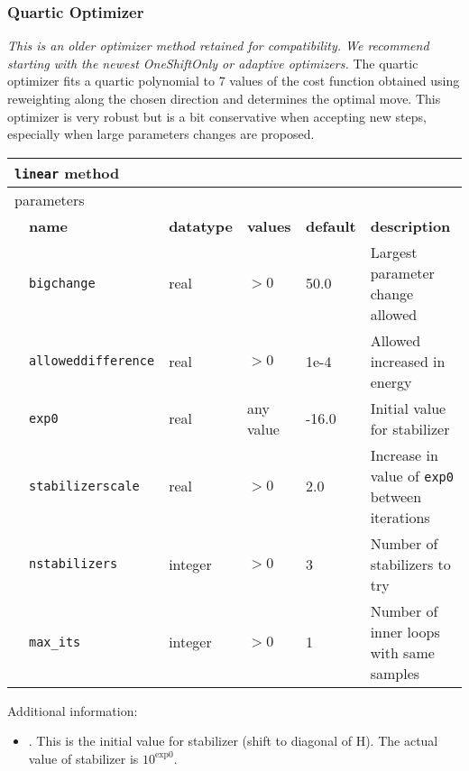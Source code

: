 \subsubsection{Quartic Optimizer}
\textit{This is an older optimizer method retained for compatibility. We recommend starting with the newest OneShiftOnly or adaptive optimizers.}
The quartic optimizer fits a quartic polynomial to 7 values of the cost function obtained using reweighting along the chosen direction and determines the optimal move.
This optimizer is very robust but is a bit conservative when accepting new steps, especially when large parameters changes are proposed.
\begin{table}[h]
\begin{center}
\begin{tabularx}{\textwidth}{l l l l l X }
\hline
\multicolumn{6}{l}{\texttt{linear} method} \\
\hline
\multicolumn{2}{l}{parameters}  & \multicolumn{4}{l}{}\\
   &   \bfseries name     & \bfseries datatype & \bfseries values & \bfseries default   & \bfseries description \\
   &   \texttt{bigchange} &  real     & $>0$ & 50.0  & Largest parameter change allowed\\
   &   \texttt{alloweddifference} &  real     & $>0$ & 1e-4 & Allowed increased in energy\\
   &   \texttt{exp0} &  real     & any value & -16.0 & Initial value for stabilizer\\
   &   \texttt{stabilizerscale} &  real     & $>0$ & 2.0 & Increase in value of \texttt{exp0} between iterations\\
   &   \texttt{nstabilizers} &  integer     & $>0$ & 3 & Number of stabilizers to try\\
   &   \texttt{max\_its} &  integer   & $>0$ & 1 & Number of inner loops with same samples\\
  \hline
\end{tabularx}
\end{center}
\end{table}

Additional information:
\begin{itemize}
\item {}. This is the initial value for stabilizer (shift to diagonal of H). The actual value of stabilizer is $10^{\textrm{exp0}}$.
\end{itemize}

